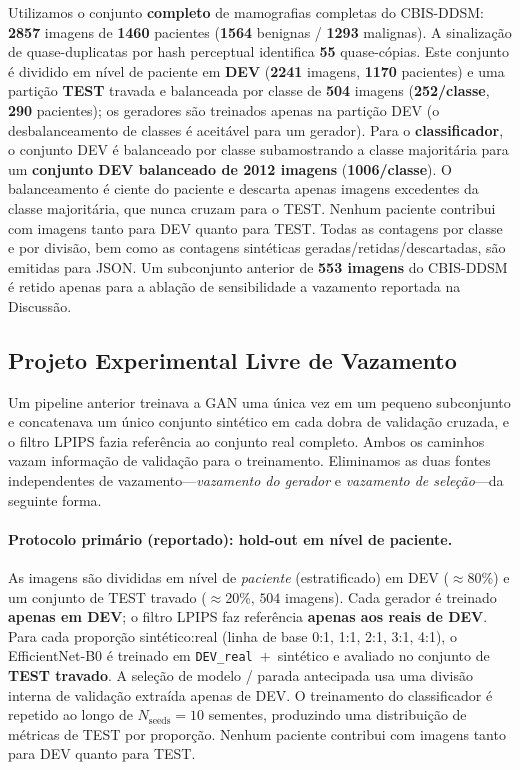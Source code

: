 \documentclass[runningheads]{llncs}
\begin{document}
Utilizamos o conjunto \textbf{completo} de mamografias completas do CBIS-DDSM:
\textbf{2857} imagens de \textbf{1460} pacientes (\textbf{1564} benignas /
\textbf{1293} malignas). A sinalização de quase-duplicatas por hash perceptual
identifica \textbf{55} quase-cópias. Este conjunto é dividido em nível de
paciente em \textbf{DEV} (\textbf{2241} imagens, \textbf{1170} pacientes) e uma
partição \textbf{TEST} travada e balanceada por classe de \textbf{504} imagens
(\textbf{252/classe}, \textbf{290} pacientes); os geradores são treinados apenas
na partição DEV (o desbalanceamento de classes é aceitável para um gerador). Para
o \textbf{classificador}, o conjunto DEV é balanceado por classe subamostrando a
classe majoritária para um \textbf{conjunto DEV balanceado de 2012 imagens}
(\textbf{1006/classe}). O balanceamento é ciente do paciente e descarta apenas
imagens excedentes da classe majoritária, que nunca cruzam para o TEST. Nenhum
paciente contribui com imagens tanto para DEV quanto para TEST. Todas as
contagens por classe e por divisão, bem como as contagens sintéticas
geradas/retidas/descartadas, são emitidas para JSON. Um subconjunto anterior de
\textbf{553 imagens} do CBIS-DDSM é retido apenas para a ablação de sensibilidade
a vazamento reportada na Discussão.

\subsection{Projeto Experimental Livre de Vazamento}
Um pipeline anterior treinava a GAN uma única vez em um pequeno subconjunto e
concatenava um único conjunto sintético em cada dobra de validação cruzada, e o
filtro LPIPS fazia referência ao conjunto real completo. Ambos os caminhos vazam
informação de validação para o treinamento. Eliminamos as duas fontes
independentes de vazamento---\emph{vazamento do gerador} e \emph{vazamento de
seleção}---da seguinte forma.

\paragraph{Protocolo primário (reportado): hold-out em nível de paciente.}
As imagens são divididas em nível de \emph{paciente} (estratificado) em DEV
($\approx$80\%) e um conjunto de TEST travado ($\approx$20\%, $504$ imagens).
Cada gerador é treinado \textbf{apenas em DEV}; o filtro LPIPS faz referência
\textbf{apenas aos reais de DEV}. Para cada proporção sintético:real (linha de
base 0:1, 1:1, 2:1, 3:1, 4:1), o EfficientNet-B0 é treinado em
\texttt{DEV\_real}~$+$~sintético e avaliado no conjunto de \textbf{TEST travado}.
A seleção de modelo / parada antecipada usa uma divisão interna de validação
extraída apenas de DEV. O treinamento do classificador é repetido ao longo de
$N_\text{seeds}{=}10$ sementes, produzindo uma distribuição de métricas de TEST
por proporção. Nenhum paciente contribui com imagens tanto para DEV quanto para
TEST.
\end{document}
